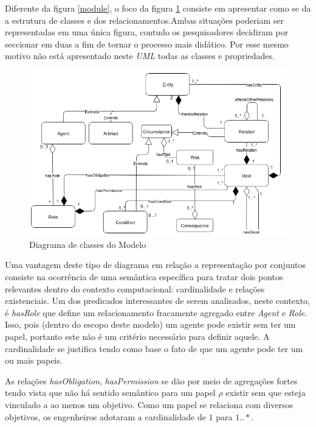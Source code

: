 Diferente da figura \ref{module}, o foco da figura \ref{classdiagrama} consiste em apresentar como se da a estrutura de classes e dos relacionamentos.Ambas situações poderiam ser representadas em uma única figura, contudo os pesquisadores decidiram por seccionar em duas a fim de tornar o processo mais didático. Por esse mesmo motivo não está apresentado neste \textit{UML} todas as classes e propriedades.  

\begin{figure}[H]
  \centering
  \includegraphics[width=1\linewidth]{figure/Class.png} 
  \caption{Diagrama de classes do Modelo }
  \label{classdiagrama}
\end{figure}

Uma vantagem deste tipo de diagrama em relação a representação por conjuntos consiste na ocorrência de uma semântica específica para tratar dois pontos relevantes dentro do contexto computacional: cardinalidade e relações existenciais. Um dos predicados interessantes de serem analisados, neste contexto, é \textit{hasRole} que define um relacionamento fracamente agregado entre \textit{Agent} e \textit{Role}. Isso, pois (dentro do escopo deste modelo) um agente pode existir sem ter um papel, portanto este não é um critério necessário para definir aquele. A cardinalidade se justifica tendo como base o fato de que um agente pode ter um ou mais papeis. 

As relações \textit{hasObligation}, \textit{hasPermission} se dão por meio de agregações fortes tendo vista que não há sentido semântico para um papel $\rho$ existir sem que esteja vinculado a ao menos um objetivo. Como um papel se relaciona com diversos objetivos, os engenheiros adotaram a cardinalidade de $1$ para $1 .. *$.

